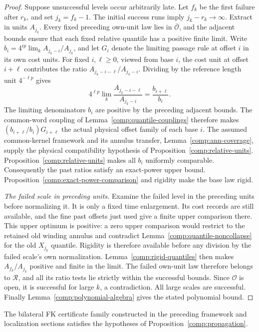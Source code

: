 \begin{proof}
Suppose unsuccessful levels occur arbitrarily late.  Let $f_k$ be
the first failure after $r_k$, and set $j_k=f_k-1$.  The initial
success runs imply $j_k-r_k\to\infty$.  Extract in units $A_{j_k}$.
Every fixed preceding own-unit law lies in $\overline{\mathcal O}$,
and the adjacent bounds ensure that each fixed relative quantile
has a positive finite limit.  Write
$b_i=4^{ip}\lim_k A_{j_k-i}/A_{j_k}$, and let $G_i$ denote the
limiting passage rule at offset $i$ in its own cost units.  For fixed
$i,\ell\ge0$, viewed from base $i$, the cost unit at offset $i+\ell$ contributes the ratio
$A_{j_k-i-\ell}/A_{j_k-i}$.  Dividing by the reference length unit
$4^{-\ell p}$ gives
\[
 4^{\ell p}\lim_k\frac{A_{j_k-i-\ell}}{A_{j_k-i}}
       =\frac{b_{i+\ell}}{b_i}.
\]
The limiting denominators $b_i$ are positive by the preceding adjacent
bounds.
The common-word coupling of Lemma~\ref{comp:quantile-couplings}
therefore makes $(b_{i+\ell}/b_i)G_{i+\ell}$ the actual physical
offset family of each base $i$.  The assumed common-kernel framework
and its annulus transfer,
Lemma~\ref{comp:ann-coverage}, supply the physical compatibility
hypothesis of Proposition~\ref{comp:relative-units}.
Proposition~\ref{comp:relative-units} makes all $b_i$ uniformly
comparable.  Consequently the past ratios satisfy an exact-power
upper bound.  Proposition~\ref{comp:exact-power-comparison} and
rigidity make the base law rigid.

\smallskip\noindent\emph{The failed scale in preceding units.}
Examine the failed level in the preceding units before normalizing it.
It is only a fixed time enlargement.  Its cost records are still
available, and the fine past offsets just used give a finite upper
comparison there.  This upper optimum is positive: a zero upper
comparison would restrict to the retained old winding annulus and
contradict Lemma~\ref{comp:quantile-noncollapse} for the old
$X_{j_k}$ quantile.  Rigidity is therefore available before any division
by the failed scale's own normalization.
Lemma~\ref{comp:rigid-quantiles} then makes
$A_{f_k}/A_{j_k}$ positive and finite in the limit.  The failed
own-unit law therefore belongs to $\mathcal R$, and all its ratio
tests lie strictly within the successful bounds.  Since $\mathcal O$
is open, it is successful for large $k$, a contradiction.
All large scales are successful.  Finally
Lemma~\ref{comp:polynomial-algebra} gives the stated polynomial bound.
\end{proof}

\begin{proposition}
\label{comp:fk-application}
The bilateral FK certificate family constructed in
the preceding framework and localization sections
satisfies the hypotheses of Proposition~\ref{comp:propagation}.
\end{proposition}

